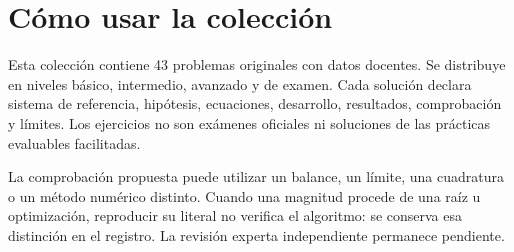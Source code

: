 
\renewcommand{\studiumcoverphoto}{assets/cover-problemas.jpg}

\frontmatter
\chapter*{Cómo usar la colección}
Esta colección contiene 43 problemas originales con datos docentes. Se distribuye en niveles básico, intermedio, avanzado y de examen. Cada solución declara sistema de referencia, hipótesis, ecuaciones, desarrollo, resultados, comprobación y límites. Los ejercicios no son exámenes oficiales ni soluciones de las prácticas evaluables facilitadas.

La comprobación propuesta puede utilizar un balance, un límite, una cuadratura o un método numérico distinto. Cuando una magnitud procede de una raíz u optimización, reproducir su literal no verifica el algoritmo: se conserva esa distinción en el registro. La revisión experta independiente permanece pendiente.
\par\smallskip

\tableofcontents
\mainmatter


